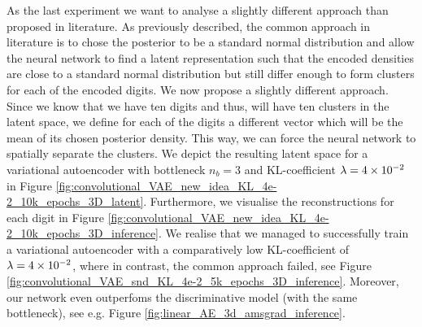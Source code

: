 As the last experiment we want to analyse a slightly different approach than proposed in literature. As previously described, the common approach in literature is to chose the posterior to be a standard normal distribution and allow the neural network to find a latent representation such that the encoded densities are close to a standard normal distribution but still differ enough to form clusters for each of the encoded digits. We now propose a slightly different approach. Since we know that we have ten digits and thus, will have ten clusters in the latent space, we define for each of the digits a different vector which will be the mean of its chosen posterior density. This way, we can force the neural network to spatially separate the clusters. We depict the resulting latent space for a variational autoencoder with bottleneck $n_b=3$ and KL-coefficient $\lambda=\num{4e-2}$ in Figure \ref{fig:convolutional_VAE_new_idea_KL_4e-2_10k_epochs_3D_latent}. Furthermore, we visualise the reconstructions for each digit in Figure \ref{fig:convolutional_VAE_new_idea_KL_4e-2_10k_epochs_3D_inference}. We realise that we managed to successfully train a variational autoencoder with a comparatively low KL-coefficient of $\lambda=\num{4e-2}$, where in contrast, the common approach failed, see Figure \ref{fig:convolutional_VAE_snd_KL_4e-2_5k_epochs_3D_inference}. Moreover, our network even outperfoms the discriminative model (with the same bottleneck), see e.g. Figure \ref{fig:linear_AE_3d_amsgrad_inference}.


